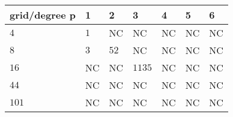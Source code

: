\begin{tabular}{lllllll}
\hline
 grid/degree p   & 1   & 2    & 3      & 4   & 5   & 6   \\
\hline
 $4$             & $1$ & NC   & NC     & NC  & NC  & NC  \\
 $8$             & $3$ & $52$ & NC     & NC  & NC  & NC  \\
 $16$            & NC  & NC   & $1135$ & NC  & NC  & NC  \\
 $44$            & NC  & NC   & NC     & NC  & NC  & NC  \\
 $101$           & NC  & NC   & NC     & NC  & NC  & NC  \\
\hline
\end{tabular}